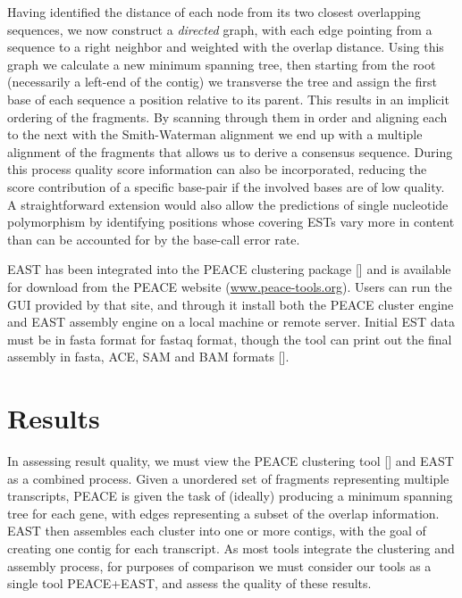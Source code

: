 \documentclass{bioinfo}
\newcommand{\peace} {{\small PEACE}}
\newcommand{\east} {{\small EAST}}
\newcommand{\peast}{{\small PEACE+EAST}}
\begin{document}

Having identified the distance of each node from its two closest
overlapping sequences, we now construct a {\it directed} graph, with
each edge pointing from a sequence to a right neighbor and weighted
with the overlap distance.  Using this graph we calculate a new
minimum spanning tree, then starting from the root (necessarily a
left-end of the contig) we transverse the tree and assign the first
base of each sequence a position relative to its parent.  This results
in an implicit ordering of the fragments.  By scanning through them in
order and aligning each to the next with the Smith-Waterman alignment
we end up with a multiple alignment of the fragments that allows us to
derive a consensus sequence.  During this process quality score
information can also be incorporated, reducing the score contribution
of a specific base-pair if the involved bases are of low quality.  A
straightforward extension would also allow the predictions of single
nucleotide polymorphism by identifying positions whose covering ESTs
vary more in content than can be accounted for by the base-call error
rate.

 \east\/ has been integrated into the
\peace\/ clustering package [\cite{Rao10}] and is available for
download from the \peace\/ website (\url{www.peace-tools.org}).
Users can run the GUI provided by that site, and through it
install both the \peace\/ cluster engine and \east\/ assembly engine
on a local machine or remote server.
Initial EST data must be in fasta format for fastaq format, though the tool can print
out the final assembly in fasta, ACE, SAM and BAM formats [\cite{Li09}].

 
\section*{Results}

In assessing result quality, we must view the \peace\/ clustering tool
[\cite{Rao10}] and \east\/ as a combined process.  Given a unordered
set of fragments representing multiple transcripts, \peace\/ is given
the task of (ideally) producing a minimum spanning tree for each gene,
with edges representing a subset of the overlap information.  \east\/
then assembles each cluster into one or more contigs, with the goal of
creating one contig for each transcript.  As most tools
integrate the clustering and assembly process, for purposes of
comparison we must consider our tools as a single tool \peast, and
assess the quality of these results.
\end{document}
